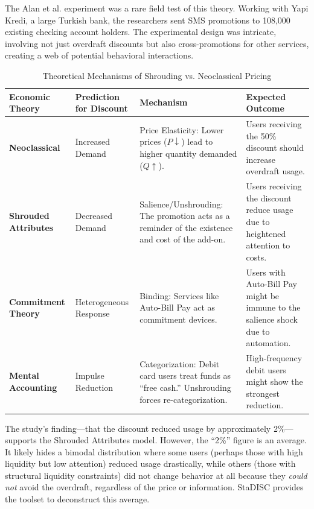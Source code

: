 \documentclass[11pt,a4paper]{article}
\begin{document}
	The Alan et al. experiment was a rare field test of this theory. Working with Yapi Kredi, a large Turkish bank, the researchers sent SMS promotions to 108,000 existing checking account holders. The experimental design was intricate, involving not just overdraft discounts but also cross-promotions for other services, creating a web of potential behavioral interactions.
	
	\begin{table}[H]
		\centering
		\caption{Theoretical Mechanisms of Shrouding vs. Neoclassical Pricing}
		\label{tab:mechanisms}
		\begin{tabular}{p{3cm} p{3.5cm} p{4cm} p{4cm}}
			\toprule
			\textbf{Economic Theory} & \textbf{Prediction for Discount} & \textbf{Mechanism} & \textbf{Expected Outcome} \\ 
			\midrule
			\textbf{Neoclassical} & Increased Demand & Price Elasticity: Lower prices ($P \downarrow$) lead to higher quantity demanded ($Q \uparrow$). & Users receiving the 50\% discount should increase overdraft usage. \\ \addlinespace
			\textbf{Shrouded Attributes} & Decreased Demand & Salience/Unshrouding: The promotion acts as a reminder of the existence and cost of the add-on. & Users receiving the discount reduce usage due to heightened attention to costs. \\ \addlinespace
			\textbf{Commitment Theory} & Heterogeneous Response & Binding: Services like Auto-Bill Pay act as commitment devices. & Users with Auto-Bill Pay might be immune to the salience shock due to automation. \\ \addlinespace
			\textbf{Mental Accounting} & Impulse Reduction & Categorization: Debit card users treat funds as ``free cash.'' Unshrouding forces re-categorization. & High-frequency debit users might show the strongest reduction. \\ 
			\bottomrule
		\end{tabular}
	\end{table}
	
	The study's finding---that the discount reduced usage by approximately 2\%---supports the Shrouded Attributes model. However, the ``2\%'' figure is an average. It likely hides a bimodal distribution where some users (perhaps those with high liquidity but low attention) reduced usage drastically, while others (those with structural liquidity constraints) did not change behavior at all because they \emph{could not} avoid the overdraft, regardless of the price or information. StaDISC provides the toolset to deconstruct this average.
	
\end{document}
